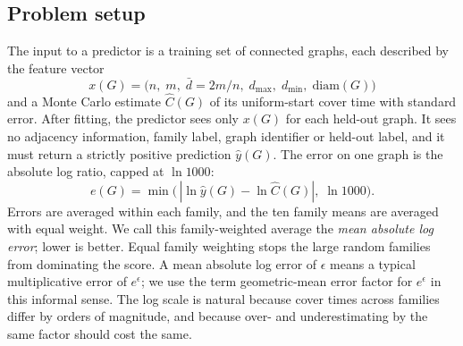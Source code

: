 \documentclass{article}
\newcommand{\Ccov}{C}
\newcommand{\diam}{\mathrm{diam}}
\begin{document}
\subsection{Problem setup}
\label{sec:setup}
The input to a predictor is a training set of connected graphs, each described by the feature vector
\begin{equation}
x(G) = \bigl(n,\; m,\; \bar d = 2m/n,\; d_{\max},\; d_{\min},\; \diam(G)\bigr)
\end{equation}
and a Monte Carlo estimate $\hat \Ccov(G)$ of its uniform-start cover time with standard error. After fitting, the predictor sees only $x(G)$ for each held-out graph. It sees no adjacency information, family label, graph identifier or held-out label, and it must return a strictly positive prediction $\hat y(G)$. The error on one graph is the absolute log ratio, capped at $\ln 1000$:
\begin{equation}
e(G) = \min\bigl(\,|\ln \hat y(G) - \ln \hat \Ccov(G)|,\; \ln 1000\bigr).
\end{equation}
Errors are averaged within each family, and the ten family means are averaged with equal weight. We call this family-weighted average the \emph{mean absolute log error}; lower is better. Equal family weighting stops the large random families from dominating the score. A mean absolute log error of $\epsilon$ means a typical multiplicative error of $e^{\epsilon}$; we use the term geometric-mean error factor for $e^{\epsilon}$ in this informal sense. The log scale is natural because cover times across families differ by orders of magnitude, and because over- and underestimating by the same factor should cost the same.
\end{document}
